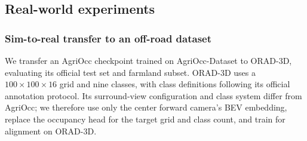 \documentclass[a4paper,fleqn]{cas-sc}
\begin{document}
\subsection{Real-world experiments}\label{sec:sim2real}
\subsubsection{Sim-to-real transfer to an off-road dataset}\label{sec:orad_transfer}
We transfer an AgriOcc checkpoint trained on AgriOcc-Dataset to ORAD-3D\citep{chen2025orad3d}, evaluating its official test set and farmland subset. ORAD-3D uses a $100\times100\times16$ grid and nine classes, with class definitions following its official annotation protocol. Its surround-view configuration and class system differ from AgriOcc; we therefore use only the center forward camera's BEV embedding, replace the occupancy head for the target grid and class count, and train for alignment on ORAD-3D.
\end{document}
